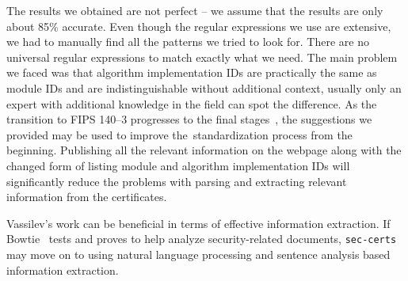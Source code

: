 The results we obtained are not perfect -- we assume that the results are only about 85\% accurate. Even though the regular expressions we use are extensive, we had to manually find all the patterns we tried to look for. There are no universal regular expressions to match exactly what we need. The main problem we faced was that algorithm implementation IDs are practically the same as module IDs and are indistinguishable without additional context, usually only an expert with additional knowledge in the field can spot the difference.
As the transition to FIPS 140--3 progresses to the final stages~\cite{fips140-3_transition}, the suggestions we provided may be used to improve the~standardization process from the beginning. Publishing all the relevant information on the webpage along with the changed form of listing module and algorithm implementation IDs will significantly reduce the problems with parsing and extracting relevant information from the certificates.

Vassilev's work can be beneficial in terms of effective information extraction. If Bowtie~\cite{vassilev_bowtie} tests and proves to help analyze security-related documents, \texttt{sec-certs} may move on to using natural language processing and sentence analysis based information extraction. 
